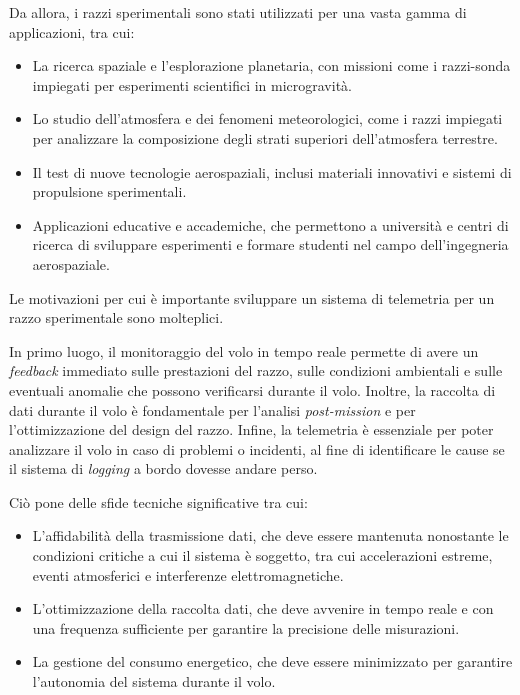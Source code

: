 \documentclass[12pt,a4paper,twoside]{book}
\begin{document}
Da allora, i razzi sperimentali sono stati utilizzati per una vasta gamma di 
applicazioni, tra cui:
\begin{itemize}
    \item La ricerca spaziale e l’esplorazione planetaria, con missioni come 
    i razzi-sonda impiegati per esperimenti scientifici in microgravità.
    \item Lo studio dell’atmosfera e dei fenomeni meteorologici, come i razzi 
    impiegati per analizzare la composizione degli strati superiori 
    dell’atmosfera terrestre.
    \item Il test di nuove tecnologie aerospaziali, inclusi materiali innovativi
     e sistemi di propulsione sperimentali.
    \item Applicazioni educative e accademiche, che permettono a università e 
    centri di ricerca di sviluppare esperimenti e formare studenti nel campo 
    dell’ingegneria aerospaziale.
\end{itemize}

Le motivazioni per cui \`e importante sviluppare un sistema di telemetria per un 
razzo sperimentale sono molteplici.

In primo luogo, il monitoraggio del volo in tempo reale permette di avere un 
\emph{feedback} immediato sulle prestazioni del razzo, sulle condizioni 
ambientali e sulle eventuali anomalie che possono verificarsi durante il volo.
Inoltre, la raccolta di dati durante il volo \`e fondamentale per l’analisi 
\emph{post-mission} e per l’ottimizzazione del design del razzo.
Infine, la telemetria \`e essenziale per poter analizzare il volo in caso di 
problemi o incidenti, al fine di identificare le cause se il sistema di 
\emph{logging} a bordo dovesse andare perso.

Ciò pone delle sfide tecniche significative tra cui:
\begin{itemize}
    \item L'affidabilità della trasmissione dati, che deve essere mantenuta 
    nonostante le condizioni critiche a cui il sistema è soggetto, tra cui 
    accelerazioni estreme, eventi atmosferici e interferenze elettromagnetiche.
    \item L'ottimizzazione della raccolta dati, che deve avvenire in tempo reale
     e con una frequenza sufficiente per garantire la precisione delle misurazioni.
    \item La gestione del consumo energetico, che deve essere minimizzato per 
    garantire l'autonomia del sistema durante il volo.
\end{itemize}
\end{document}
